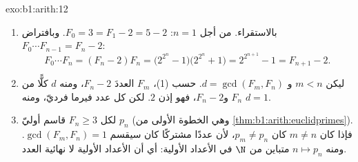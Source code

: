 \begin{solution}{exo:b1:arith:12}
\begin{enumerate}
  \item بالاستقراء. من أجل $n = 1$: $F_0 = 3 = F_1 - 2 = 5 - 2$.
        وبافتراض $F_0\cdots F_{n-1} = F_n - 2$:
        \[
        F_0 \cdots F_n = (F_n - 2)F_n
        = \bigl(2^{2^n} - 1\bigr)\bigl(2^{2^n} + 1\bigr)
        = 2^{2^{n+1}} - 1 = F_{n+1} - 2 .
        \]
  \item ليكن $m < n$ و $d = \gcd(F_m, F_n)$. حسب (1)،  $F_m$
        العددَ $F_n - 2$، ومنه  $d$ كلًّا من $F_n$ و$F_n -
        2$، فهو  إذن $2$. لكن كل عدد فيرما فرديّ، ومنه
        $d = 1$.
  \item لكل $F_n \geq 3$ قاسم أوليّ $p_n$
        (وهي الخطوة الأولى من \cref{thm:b1:arith:euclidprimes}). فإذا كان $m
        \neq n$ كان $p_m \neq p_n$، لأن عددًا  مشتركًا كان
        سيقسم $\gcd(F_m, F_n) = 1$. ومنه  $n \mapsto p_n$
        متباين من $\N$ في الأعداد الأولية: أي أن الأعداد الأولية
        لا نهائية العدد.
\end{enumerate}
\end{solution}

